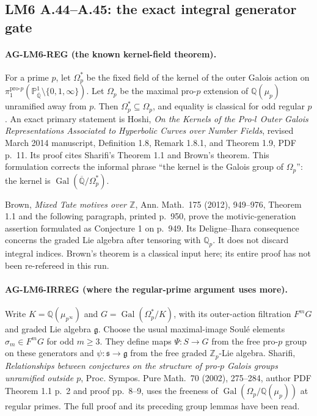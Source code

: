 \documentclass[11pt,a4paper]{article}
\begin{document}
\subsection{LM6 A.44--A.45: the exact integral generator gate}
\label{ag:lm6}

\paragraph{AG-LM6-REG (the known kernel-field theorem).}
For a prime $p$, let $\Omega_p^*$ be the fixed field of the kernel
of the outer Galois action on
$\pi_1^{\mathrm{pro}\text{-}p}
(\mathbb P^1_{\overline{\mathbb Q}}\setminus\{0,1,\infty\})$.
Let $\Omega_p$ be the maximal pro-$p$ extension of
$\mathbb Q(\mu_p)$ unramified away from $p$. Then
$\Omega_p^*\subseteq\Omega_p$, and equality is classical for odd
regular $p$. An exact primary statement is Hoshi,
\emph{On the Kernels of the Pro-$l$ Outer Galois Representations
Associated to Hyperbolic Curves over Number Fields}, revised March
2014 manuscript, Definition 1.8, Remark 1.8.1, and Theorem 1.9,
PDF p.~11. Its proof cites Sharifi's Theorem 1.1 and Brown's theorem.
This formulation corrects the informal phrase ``the kernel is the
Galois group of $\Omega_p$'': the kernel is
$\operatorname{Gal}(\overline{\mathbb Q}/\Omega_p^*)$.

Brown, \emph{Mixed Tate motives over $\mathbb Z$}, Ann. Math.~175
(2012), 949--976, Theorem 1.1 and the following paragraph, printed
p.~950, prove the motivic-generation assertion formulated as
Conjecture 1 on p.~949. Its Deligne--Ihara consequence concerns the
graded Lie algebra after tensoring with $\mathbb Q_p$. It does not
discard integral indices. Brown's theorem is a classical input here;
its entire proof has not been re-refereed in this run.

\paragraph{AG-LM6-IRREG (where the regular-prime argument uses more).}
Write $K=\mathbb Q(\mu_{p^\infty})$ and
$G=\operatorname{Gal}(\Omega_p^*/K)$, with its outer-action
filtration $F^mG$ and graded Lie algebra $\mathfrak g$.
Choose the usual maximal-image Soulé elements $\sigma_m\in F^mG$
for odd $m\ge3$. They define maps $\Psi:S\to G$ from the free
pro-$p$ group on these generators and
$\psi:\mathfrak s\to\mathfrak g$ from the free graded
$\mathbb Z_p$-Lie algebra. Sharifi,
\emph{Relationships between conjectures on the structure of pro-$p$
Galois groups unramified outside $p$}, Proc. Sympos. Pure Math.~70
(2002), 275--284, author PDF Theorem 1.1 p.~2 and proof pp.~8--9,
uses the freeness of
$\operatorname{Gal}(\Omega_p/\mathbb Q(\mu_p))$ at regular primes.
The full proof and its preceding group lemmas have been read.
\end{document}
